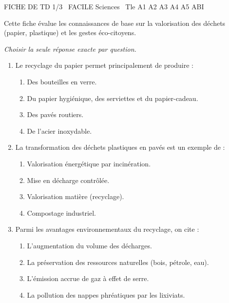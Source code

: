 \documentclass[11pt]{article}
\begin{document}
\thispagestyle{empty}

\begin{tcolorbox}[enhanced,colback=popink,colframe=popink,arc=10pt,boxrule=0pt,left=12pt,right=12pt,top=9pt,bottom=9pt]
{\color{white}\popxbold\small FICHE DE TD 1/3 \textbullet\ FACILE \hfill Sciences \textbullet\ Tle A1 A2 A3 A4 A5 ABI\par}
\end{tcolorbox}
\vspace{4pt}

Cette fiche évalue les connaissances de base sur la valorisation des déchets (papier, plastique) et les gestes éco-citoyens.

\begin{exercice}
\emph{Choisir la seule réponse exacte par question.}
\begin{enumerate}
    \item Le recyclage du papier permet principalement de produire :
    \begin{enumerate}
        \item Des bouteilles en verre.
        \item Du papier hygiénique, des serviettes et du papier-cadeau.
        \item Des pavés routiers.
        \item De l'acier inoxydable.
    \end{enumerate}
    
    \item La transformation des déchets plastiques en pavés est un exemple de :
    \begin{enumerate}
        \item Valorisation énergétique par incinération.
        \item Mise en décharge contrôlée.
        \item Valorisation matière (recyclage).
        \item Compostage industriel.
    \end{enumerate}
    
    \item Parmi les avantages environnementaux du recyclage, on cite :
    \begin{enumerate}
        \item L'augmentation du volume des décharges.
        \item La préservation des ressources naturelles (bois, pétrole, eau).
        \item L'émission accrue de gaz à effet de serre.
        \item La pollution des nappes phréatiques par les lixiviats.
    \end{enumerate}
\end{enumerate}
\end{exercice}
\end{document}
